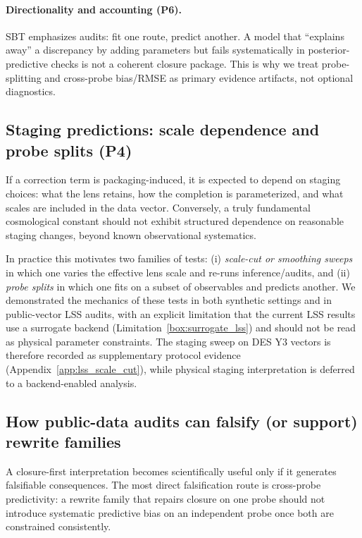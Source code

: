 \documentclass[11pt]{article}
\theoremstyle{definition}
\theoremstyle{plain}
\theoremstyle{remark}
\newcounter{limitation}[section]
\begin{document}
\paragraph{Directionality and accounting (P6).}
SBT emphasizes audits: fit one route, predict another.
A model that ``explains away'' a discrepancy by adding parameters but fails systematically in posterior-predictive checks is not a coherent closure package.
This is why we treat probe-splitting and cross-probe bias/RMSE as primary evidence artifacts, not optional diagnostics.

\subsection{Staging predictions: scale dependence and probe splits (P4)}\label{sec:discussion:staging}
If a correction term is packaging-induced, it is expected to depend on staging choices: what the lens retains, how the completion is parameterized, and what scales are included in the data vector. Conversely, a truly fundamental cosmological constant should not exhibit structured dependence on reasonable staging changes, beyond known observational systematics.

In practice this motivates two families of tests:
(i) \emph{scale-cut or smoothing sweeps} in which one varies the effective lens scale and re-runs inference/audits, and
(ii) \emph{probe splits} in which one fits on a subset of observables and predicts another.
We demonstrated the mechanics of these tests in both synthetic settings and in public-vector LSS audits, with an explicit limitation that the current LSS results use a surrogate backend (Limitation~\ref{box:surrogate_lss}) and should not be read as physical parameter constraints.
The staging sweep on DES Y3 vectors is therefore recorded as supplementary protocol evidence (Appendix~\ref{app:lss_scale_cut}), while physical staging interpretation is deferred to a backend-enabled analysis.

\subsection{How public-data audits can falsify (or support) rewrite families}\label{sec:discussion:falsify}
A closure-first interpretation becomes scientifically useful only if it generates falsifiable consequences. The most direct falsification route is cross-probe predictivity:
a rewrite family that repairs closure on one probe should not introduce systematic predictive bias on an independent probe once both are constrained consistently.
\end{document}
